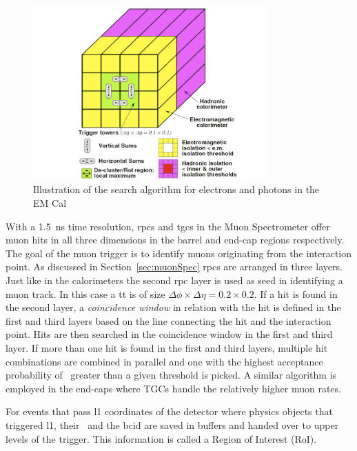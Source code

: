 \begin{figure}[!h]
\centering
   \includegraphics[width=0.8\textwidth]{figures/TTalg.png}
	\caption{Illustration of the search algorithm for electrons and photons in the EM Cal}
	\label{fig:TTalg}
\end{figure}

\par With a \SI{1.5}{\ns} time resolution, \acrshort{rpc}s and \acrshort{tgc}s in the Muon Spectrometer 
offer muon hits in all three dimensions in the barrel and end-cap regions 
respectively. The goal of the muon trigger is to identify muons originating 
from the interaction point. As discussed in Section~\ref{sec:muonSpec} \acrshort{rpc}s are 
arranged in three layers. Just like in the calorimeters the second \acrshort{rpc} layer is used as seed 
in identifying a muon track. In this case a \acrshort{tt} is of size $\Delta\phi\times\Delta\eta = 0.2\times0.2$.
 If a hit is found in the second layer, a {\it coincidence 
window} in relation with the hit is defined in the first and third layers based on the 
line connecting the hit and the interaction point. Hits are then searched in the coincidence 
window in the first and third layer. If more than one hit is found in the first 
and third layers, multiple hit combinations are combined in parallel and one 
with the highest acceptance probability of \pT~greater than a given threshold 
is picked. A similar algorithm is employed in the end-caps where TGCs handle the 
relatively higher muon rates. 

\par For events that pass \acrshort{l1} coordinates of the detector where physics 
objects that triggered \acrshort{l1}, their \pT\ and the \acrshort{bcid} are saved 
in buffers and handed over to upper levels of the trigger. This information is called 
a Region of Interest (RoI). 

